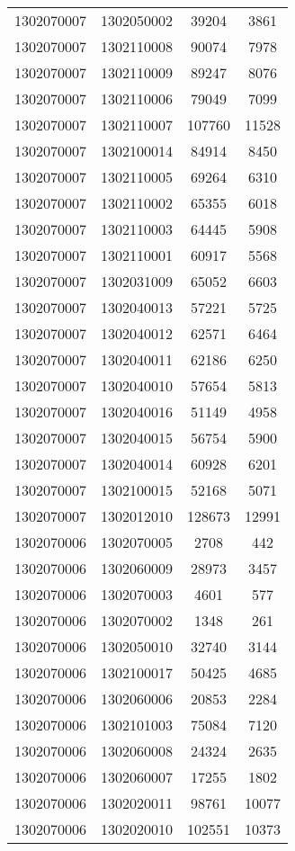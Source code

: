 \begin{longtable}[h]{llcc}
		1302070007 & 1302050002 & 39204 & 3861\\
		1302070007 & 1302110008 & 90074 & 7978\\
		1302070007 & 1302110009 & 89247 & 8076\\
		1302070007 & 1302110006 & 79049 & 7099\\
		1302070007 & 1302110007 & 107760 & 11528\\
		1302070007 & 1302100014 & 84914 & 8450\\
		1302070007 & 1302110005 & 69264 & 6310\\
		1302070007 & 1302110002 & 65355 & 6018\\
		1302070007 & 1302110003 & 64445 & 5908\\
		1302070007 & 1302110001 & 60917 & 5568\\
		1302070007 & 1302031009 & 65052 & 6603\\
		1302070007 & 1302040013 & 57221 & 5725\\
		1302070007 & 1302040012 & 62571 & 6464\\
		1302070007 & 1302040011 & 62186 & 6250\\
		1302070007 & 1302040010 & 57654 & 5813\\
		1302070007 & 1302040016 & 51149 & 4958\\
		1302070007 & 1302040015 & 56754 & 5900\\
		1302070007 & 1302040014 & 60928 & 6201\\
		1302070007 & 1302100015 & 52168 & 5071\\
		1302070007 & 1302012010 & 128673 & 12991\\
		1302070006 & 1302070005 & 2708 & 442\\
		1302070006 & 1302060009 & 28973 & 3457\\
		1302070006 & 1302070003 & 4601 & 577\\
		1302070006 & 1302070002 & 1348 & 261\\
		1302070006 & 1302050010 & 32740 & 3144\\
		1302070006 & 1302100017 & 50425 & 4685\\
		1302070006 & 1302060006 & 20853 & 2284\\
		1302070006 & 1302101003 & 75084 & 7120\\
		1302070006 & 1302060008 & 24324 & 2635\\
		1302070006 & 1302060007 & 17255 & 1802\\
		1302070006 & 1302020011 & 98761 & 10077\\
		1302070006 & 1302020010 & 102551 & 10373\\

\end{longtable}
